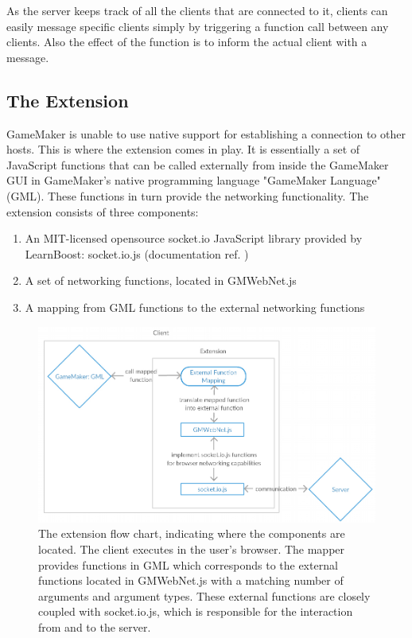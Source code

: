 \documentclass[bsc, 12pt, twoside, singlespacing, parskip, abbrevs, notimes, normalheadings, logo]{styles/infthesis}
\begin{document}
As the server keeps track of all the clients that are connected to it, clients can easily message specific clients simply by triggering a function call between any clients. Also the effect of the function is to inform the actual client with a message.

\subsection{The Extension}
GameMaker is unable to use native support for establishing a connection to other hosts. This is where the extension comes in play.
It is essentially a set of JavaScript functions that can be called externally from inside the GameMaker GUI in GameMaker's native programming language "GameMaker Language" (GML). These functions in turn provide the networking functionality.
The extension consists of three components:
\begin{enumerate}
\item An MIT-licensed opensource socket.io JavaScript library provided by LearnBoost: socket.io.js (documentation ref. \cite{socketiojs})
\item A set of networking functions, located in GMWebNet.js
\item A mapping from GML functions to the external networking functions
\end{enumerate}

\begin{figure}[H]
\includegraphics[scale=0.42]{images/extension_flow.jpg}
\caption{The extension flow chart, indicating where the components are located. The client executes in the user's browser. The mapper provides functions in GML which corresponds to the external functions located in GMWebNet.js with a matching number of arguments and argument types. These external functions are closely coupled with socket.io.js, which is responsible for the interaction from and to the server.}
\label{fig:extension_flow}
\vspace{1em}
\end{figure}
\end{document}
